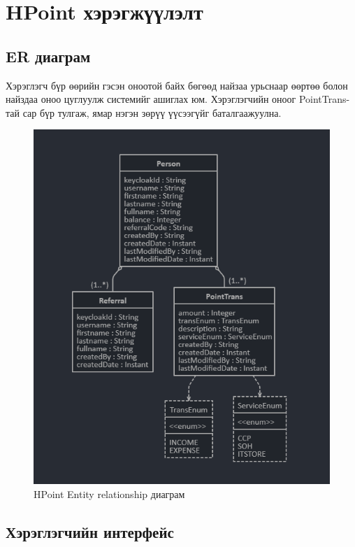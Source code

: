 \chapter{HPoint хэрэгжүүлэлт}
\section{ER диаграм}

Хэрэглэгч бүр өөрийн гэсэн оноотой байх бөгөөд найзаа урьснаар өөртөө болон найздаа оноо цуглуулж системийг ашиглах юм. Хэрэглэгчийн оноог PointTrans-тай сар бүр тулгаж, ямар нэгэн зөрүү үүсээгүйг баталгаажуулна.
\begin{figure}
\centering
\caption{HPoint Entity relationship диаграм}
\includegraphics{imgs/erd.png}
\end{figure}

\section{Хэрэглэгчийн интерфейс}

